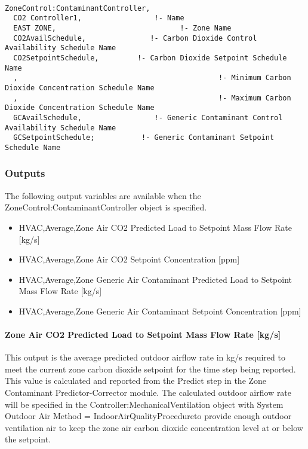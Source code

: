 \begin{lstlisting}

ZoneControl:ContaminantController,
  CO2 Controller1,                 !- Name
  EAST ZONE,                             !- Zone Name
  CO2AvailSchedule,               !- Carbon Dioxide Control Availability Schedule Name
  CO2SetpointSchedule,         !- Carbon Dioxide Setpoint Schedule Name
  ,                                               !- Minimum Carbon Dioxide Concentration Schedule Name
  ,                                               !- Maximum Carbon Dioxide Concentration Schedule Name
  GCAvailSchedule,                 !- Generic Contaminant Control Availability Schedule Name
  GCSetpointSchedule;           !- Generic Contaminant Setpoint Schedule Name
\end{lstlisting}

\subsubsection{Outputs}\label{outputs-4-020}

The following output variables are available when the ZoneControl:ContaminantController object is specified.

\begin{itemize}
\item
  HVAC,Average,Zone Air CO2 Predicted Load to Setpoint Mass Flow Rate {[}kg/s{]}
\item
  HVAC,Average,Zone Air CO2 Setpoint Concentration {[}ppm{]}
\item
  HVAC,Average,Zone Generic Air Contaminant Predicted Load to Setpoint Mass Flow Rate {[}kg/s{]}
\item
  HVAC,Average,Zone Generic Air Contaminant Setpoint Concentration {[}ppm{]}
\end{itemize}

\paragraph{Zone Air CO2 Predicted Load to Setpoint Mass Flow Rate {[}kg/s{]}}\label{zone-air-co2-predicted-load-to-setpoint-mass-flow-rate-kgs}

This output is the average predicted outdoor airflow rate in kg/s required to meet the current zone carbon dioxide setpoint for the time step being reported. This value is calculated and reported from the Predict step in the Zone Contaminant Predictor-Corrector module. The calculated outdoor airflow rate will be specified in the Controller:MechanicalVentilation object with System Outdoor Air Method = IndoorAirQualityProcedureto provide enough outdoor ventilation air to keep the zone air carbon dioxide concentration level at or below the setpoint.

